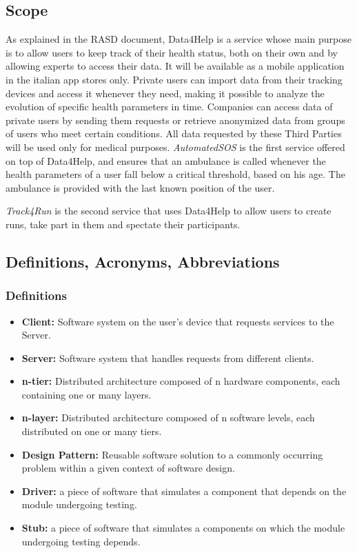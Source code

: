 \documentclass[titlepage]{article}
\begin{document}
\subsection{Scope}
As explained in the RASD document, Data4Help is a service whose main purpose is to allow users to keep track of their health status, both on their own and by allowing experts to access their data. It will be available as a mobile application in the italian app stores only. 
Private users can import data from their tracking devices and access it whenever they need, making it possible to analyze the evolution of specific health parameters in time.
Companies can access data of private users by sending them requests or retrieve anonymized data from groups of users who meet certain conditions. All data requested by these Third Parties will be used only for medical purposes.
\newline
\textit{AutomatedSOS} is the first service offered on top of Data4Help, and ensures that an ambulance is called whenever the health parameters of a user fall below a critical threshold, based on his age. The ambulance is provided with the last known position of the user.

\textit{Track4Run} is the second service that uses Data4Help to allow users to create runs, take part in them and spectate their participants. 

\subsection{Definitions, Acronyms, Abbreviations}


	\subsubsection{Definitions}
	
	\begin{itemize}
				\item {\bf Client: }Software system on the user’s device that requests services to the Server.
				\item {\bf Server: }Software system that handles requests from different clients.
				\item {\bf n-tier: }Distributed architecture composed of n hardware components, each containing one or many layers.
				\item {\bf n-layer: }Distributed architecture composed of n software levels, each distributed on one or many tiers.
				\item {\bf Design Pattern: }Reusable software solution to a commonly occurring problem within a given context of software design.
				\item {\bf Driver: }a piece of software that simulates a component that depends on the module undergoing testing.
				\item {\bf Stub: }a piece of software that simulates a components on which the module undergoing testing depends.
	\end{itemize}
	
\end{document}
